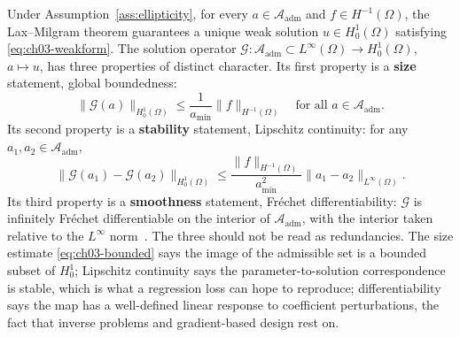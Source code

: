 \begin{proposition}
\label{prop:ch03-darcy}
Under Assumption~\ref{ass:ellipticity}, for
every $a \in \mathcal{A}_{\text{adm}}$ and $f \in H^{-1}(\Omega)$, the
Lax--Milgram theorem guarantees a unique weak solution $u \in H^1_0(\Omega)$
satisfying \eqref{eq:ch03-weakform}. The solution operator
$\mathcal{G} : \mathcal{A}_{\text{adm}} \subset L^\infty(\Omega) \to H^1_0(\Omega)$,
$a \mapsto u$, has three properties of distinct character. Its first property is
a \textbf{size} statement, global boundedness:
\begin{equation}
  \| \mathcal{G}(a) \|_{H^1_0(\Omega)} \le \frac{1}{a_{\min}} \|f\|_{H^{-1}(\Omega)}
  \quad \text{for all } a \in \mathcal{A}_{\text{adm}}.
  \label{eq:ch03-bounded}
\end{equation}
Its second property is a \textbf{stability} statement, Lipschitz continuity: for any
$a_1, a_2 \in \mathcal{A}_{\text{adm}}$,
\begin{equation}
  \| \mathcal{G}(a_1) - \mathcal{G}(a_2) \|_{H^1_0(\Omega)} \le \frac{\|f\|_{H^{-1}(\Omega)}}{a_{\min}^2} \|a_1 - a_2\|_{L^\infty(\Omega)}.
  \label{eq:ch03-lipschitz}
\end{equation}
Its third property is a \textbf{smoothness} statement, Fr{\'e}chet differentiability: $\mathcal{G}$ is infinitely
Fr{\'e}chet differentiable on the interior of $\mathcal{A}_{\text{adm}}$, with
the interior taken relative to the $L^\infty$ norm~\cite{stuart2010inverse}. The
three should not be read as redundancies. The size estimate
\eqref{eq:ch03-bounded} says the image of the admissible set is a bounded subset
of $H^1_0$; Lipschitz continuity says the
parameter-to-solution correspondence is stable, which is what a regression loss
can hope to reproduce; differentiability says the map has a well-defined linear
response to coefficient perturbations, the fact that inverse problems and
gradient-based design rest on.
\end{proposition}

